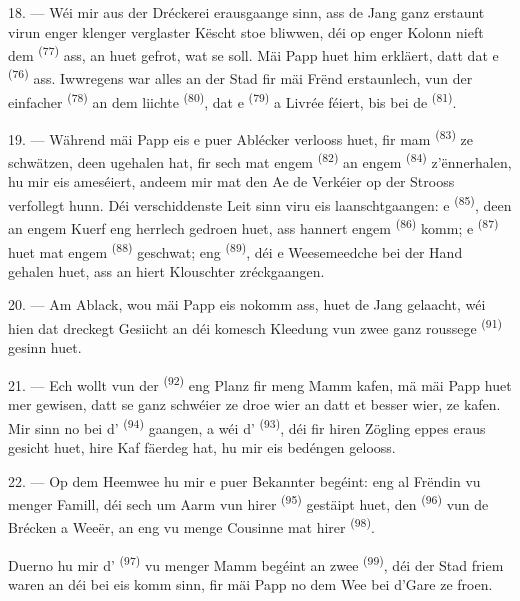 \VUsaut{3.0mm}

18. --- Wéi mir aus der Dréckerei erausgaange sinn, ass de Jang ganz erstaunt virun
enger klenger verglaster Këscht stoe bliwwen, déi op enger Kolonn nieft dem
 \textsuperscript{(77)} ass, an huet gefrot, wat se soll.
Mäi Papp huet him erkläert, datt dat e  \textsuperscript{(76)}
ass. Iwwregens war alles an der Stad fir mäi Frënd erstaunlech, vun der einfacher
 \textsuperscript{(78)} an dem liichte 
\textsuperscript{(80)}, dat e  \textsuperscript{(79)} a Livrée féiert,
bis bei de  \textsuperscript{(81)}.

19. --- Während mäi Papp eis e puer Ablécker verlooss huet, fir mam
 \textsuperscript{(83)} ze schwätzen, deen ugehalen hat, fir
sech mat engem  \textsuperscript{(82)} an engem 
\textsuperscript{(84)} z'ënnerhalen, hu mir eis ameséiert, andeem mir mat den Ae
de Verkéier op der Strooss verfollegt hunn. Déi verschiddenste Leit sinn viru eis
laanschtgaangen: e  \textsuperscript{(85)}, deen an engem
Kuerf eng herrlech  gedroen huet, ass hannert engem
 \textsuperscript{(86)} komm; e 
\textsuperscript{(87)} huet mat engem  \textsuperscript{(88)}
geschwat; eng  \textsuperscript{(89)}, déi e Weesemeedche bei
der Hand gehalen huet, ass an hiert Klouschter zréckgaangen.

\VUsaut{3.0mm}

20. --- Am Ablack, wou mäi Papp eis nokomm ass, huet de Jang gelaacht, wéi hien
dat dreckegt Gesiicht an déi komesch Kleedung vun zwee ganz roussege
 \textsuperscript{(91)} gesinn huet.

21. --- Ech wollt vun der  \textsuperscript{(92)} eng Planz fir
meng Mamm kafen, mä mäi Papp huet mer gewisen, datt se ganz schwéier ze droe wier an
datt et besser wier,  ze kafen. Mir sinn no bei d'
\textsuperscript{(94)} gaangen, a wéi d' \textsuperscript{(93)},
déi fir hiren Zögling eppes eraus gesicht huet, hire Kaf fäerdeg hat, hu mir eis
bedéngen gelooss.

22. --- Op dem Heemwee hu mir e puer Bekannter begéint: eng al Frëndin vu menger
Famill, déi sech um Aarm vun hirer  \textsuperscript{(95)}
gestäipt huet, den  \textsuperscript{(96)} vun de Brécken a
Weeër, an eng vu menge Cousinne mat hirer 
\textsuperscript{(98)}.

Duerno hu mir d' \textsuperscript{(97)} vu menger Mamm begéint an
zwee  \textsuperscript{(99)}, déi der Stad friem waren an déi bei eis
komm sinn, fir mäi Papp no dem Wee bei d'Gare ze froen.

\VUsaut{6.0mm}
\VUfilet{22mm}
